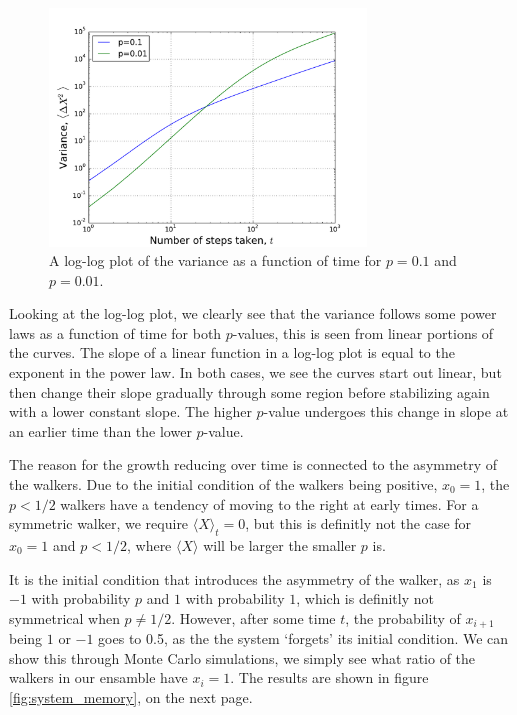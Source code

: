 \documentclass[a4paper, 11pt, notitlepage, english]{article}
\begin{document}
\begin{figure}[h]
\centering
\includegraphics[width=0.75\textwidth]{loglog.pdf}
\caption{A log-log plot of the variance as a function of time for $p=0.1$ and $ p=0.01$. \label{fig:loglog}}
\end{figure}

Looking at the log-log plot, we clearly see that the variance follows some power laws as a function of time for both $p$-values, this is seen from linear portions of the curves. The slope of a linear function in a log-log plot is equal to the exponent in the power law. In both cases, we see the curves start out linear, but then change their slope gradually through some region before stabilizing again with a lower constant slope. The higher $p$-value undergoes this change in slope at an earlier time than the lower $p$-value.

The reason for the growth reducing over time is connected to the asymmetry of the walkers. Due to the initial condition of the walkers being positive, $x_0 = 1$, the $p<1/2$ walkers have a tendency of moving to the right at early times. For a symmetric walker, we require $\langle X \rangle_t = 0$, but this is definitly not the case for $x_0 = 1$ and $p < 1/2$, where $\langle X \rangle$ will be larger the smaller $p$ is.

It is the initial condition that introduces the asymmetry of the walker, as $x_1$ is $-1$ with probability $p$ and $1$ with probability $1$, which is definitly not symmetrical when $p \neq 1/2$. However, after some time $t$, the probability of $x_{i+1}$ being $1$ or $-1$ goes to 0.5, as the the system `forgets' its initial condition. We can show this through Monte Carlo simulations, we simply see what ratio of the walkers in our ensamble have $x_i = 1$. The results are shown in figure \ref{fig:system_memory}, on the next page.
\end{document}
